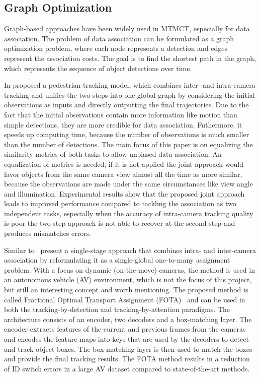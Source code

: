\subsection{Graph Optimization}\label{subsec:graph_optimization}
Graph-based approaches have been widely used in MTMCT, especially for data association. The problem of data association can be formulated as a graph optimization problem, where each node represents a detection and edges represent the association costs. The goal is to find the shortest path in the graph, which represents the sequence of object detections over time.

In \citeyear{Chen17a} \textcite{Chen17a} proposed a pedestrian tracking model, which combines inter- and intra-camera tracking and unifies the two steps into one global graph by considering the initial observations as inputs and directly outputting the final trajectories. Due to the fact that the initial observations contain more information like motion than simple detections, they are more credible for data association. Futhermore, it speeds up computing time, because the number of observations is much smaller than the number of detections. The main focus of this paper is on equalizing the similarity metrics of both tasks to allow unbiased data association. An equalization of metrics is needed, if it is not applied the joint approach would favor objects from the same camera view almost all the time as more similar, because the observations are made under the same circumstances like view angle and illumination. Experimental results show that the proposed joint approach leads to improved performance compared to tackling the association as two independent tasks, especially when the accuracy of intra-camera tracking quality is poor the two step approach is not able to recover at the second step and produces mismatches errors.

Similar to~\cite{Chen17a} \citeauthor{Nguyen22b} present a single-stage approach that combines intra- and inter-camera association by reformulating it as a single-global one-to-many assignment problem. With a focus on dynamic (on-the-move) cameras, the method is used in an autonomous vehicle (AV) environment, which is not the focus of this project, but still an interesting concept and worth mentioning. The proposed method is called Fractional Optimal Transport Assignment (FOTA)~\cite{Nguyen22b} and can be used in both the tracking-by-detection and tracking-by-attention paradigms. The architecture consists of an encoder, two decoders and a box-matching layer. The encoder extracts features of the current and previous frames from the cameras and encodes the feature maps into keys that are used by the decoders to detect and track object boxes. The box-matching layer is then used to match the boxes and provide the final tracking results. The FOTA method results in a reduction of ID switch errors in a large AV dataset compared to state-of-the-art methods.

